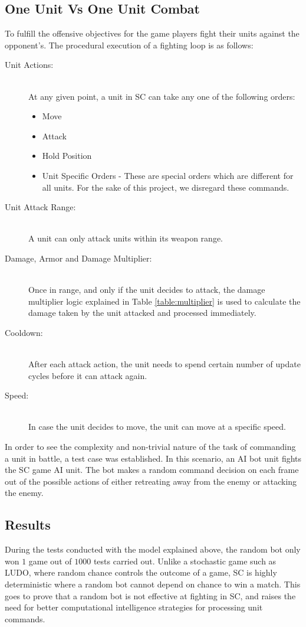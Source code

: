\documentclass[conference]{IEEEtran}
\begin{document}
\subsection{One Unit Vs One Unit Combat} 
To fulfill the offensive objectives for the game players fight their units against the opponent's. The procedural execution of a fighting loop is as follows:
\begin{description}
	\item[Unit Actions:] \hfill \\ 
At any given point, a unit in SC can take any one of the following orders:
\begin{itemize}
\item Move
\item Attack
\item Hold Position
\item Unit Specific Orders - These are special orders which are different for all units. For the sake of this project, we disregard these commands.
\end{itemize}
  	\item[Unit Attack Range:] \hfill \\ 
A unit can only attack units within its weapon range.
  	\item[Damage, Armor and Damage Multiplier:] \hfill \\
Once in range, and only if the unit decides to attack, the damage multiplier logic explained in Table \ref{table:multiplier} is used to calculate the damage taken by the unit attacked and processed immediately.
  	\item[Cooldown:] \hfill \\
After each attack action, the unit needs to spend certain number of update cycles before it can attack again.
	\item[Speed:] \hfill \\
In case the unit decides to move, the unit can move at a specific speed.
\end{description}
In order to see the complexity and non-trivial nature of the task of commanding a unit in battle, a test case was established. In this scenario, an AI bot unit fights the SC game AI unit. The bot makes a random command decision on each frame out of the possible actions of either retreating away from the enemy or attacking the enemy.

\subsection{Results} 
During the tests conducted with the model explained above, the random bot only won $1$ game out of $1000$ tests carried out. Unlike a stochastic game such as LUDO, where random chance controls the outcome of a game, SC is highly deterministic where a random bot cannot depend on chance to win a match. This goes to prove that a random bot is not effective at fighting in SC, and raises the need for better computational intelligence strategies for processing unit commands.
\end{document}
